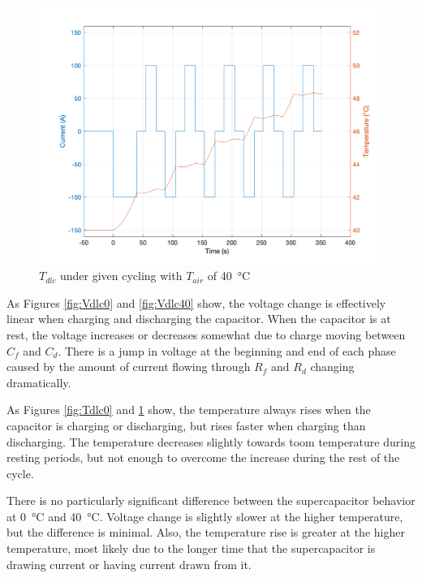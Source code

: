 \documentclass[fleqn]{article}
\begin{document}
\begin{figure}[!htb]
\begin{center}
\includegraphics[width=0.76\linewidth]{Tdlc_40.png}
\caption{$T_{dlc}$ under given cycling with $T_{air}$ of \SI{40}{\celsius}}
\label{fig:Tdlc40}
\end{center}
\end{figure}

As Figures \ref{fig:Vdlc0} and \ref{fig:Vdlc40} show, the voltage change is effectively linear when charging and discharging the capacitor. When the capacitor is at rest, the voltage increases or decreases somewhat due to charge moving between $C_f$ and $C_d$.  There is a jump in voltage at the beginning and end of each phase caused by the amount of current flowing through $R_f$ and $R_d$ changing dramatically.

As Figures \ref{fig:Tdlc0} and \ref{fig:Tdlc40} show, the temperature always rises when the capacitor is charging or discharging, but rises faster when charging than discharging.  The temperature decreases slightly towards toom temperature during resting periods, but not enough to overcome the increase during the rest of the cycle.

There is no particularly significant difference between the supercapacitor behavior at \SI{0}{\celsius} and \SI{40}{\celsius}.  Voltage change is slightly slower at the higher temperature, but the difference is minimal. Also, the temperature rise is greater at the higher temperature, most likely due to the longer time that the supercapacitor is drawing current or having current drawn from it.
\end{document}
